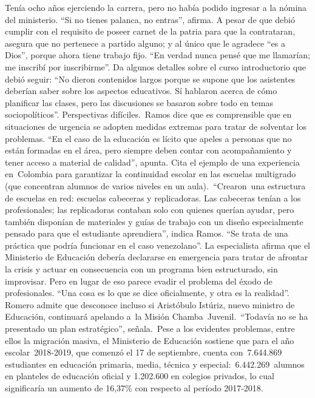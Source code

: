 \documentclass{article}%
\begin{document}
\newline%
%
Tenía ocho años ejerciendo la carrera, pero no había podido ingresar a la nómina del ministerio. “Si no tienes palanca, no entras”, afirma. A pesar de que debió cumplir con el requisito de poseer carnet de la patria para que la contrataran, asegura que no pertenece a partido alguno; y al único que le agradece “es a Dios”, porque ahora tiene trabajo fijo. “En verdad nunca pensé que me llamarían; me inscribí por inscribirme”.%
\newline%
%
Da algunos detalles sobre el curso introductorio que debió seguir: “No dieron contenidos largos porque se supone que los asistentes deberían saber sobre los aspectos educativos. Sí hablaron acerca de cómo planificar las clases, pero las discusiones se basaron sobre todo en temas sociopolíticos”.%
\newline%
%
Perspectivas difíciles.~Ramos dice que es comprensible que en situaciones de urgencia se adopten medidas extremas para tratar de solventar los problemas. “En el caso de la educación es lícito que apeles a personas que no están formadas en el área, pero siempre deben contar con acompañamiento y tener acceso a material de calidad”, apunta.%
\newline%
%
Cita el ejemplo de una experiencia en~Colombia para garantizar la continuidad escolar en las escuelas multigrado (que concentran alumnos de varios niveles en un aula).~“Crearon~una estructura de escuelas en red: escuelas cabeceras y replicadoras. Las cabeceras tenían a los profesionales; las replicadoras contaban solo con quienes querían ayudar, pero también disponían de materiales y guías de trabajo con un diseño especialmente pensado para que el estudiante aprendiera”, indica Ramos. “Se trata de una práctica que podría funcionar en el caso venezolano”.%
\newline%
%
La especialista afirma que el Ministerio de Educación debería declararse en emergencia para tratar de afrontar la crisis y actuar en consecuencia con un programa bien estructurado, sin improvisar. Pero en lugar de eso parece evadir el problema del éxodo de profesionales. “Una cosa es lo que se dice oficialmente, y otra es la realidad”.%
\newline%
%
Romero admite que desconoce incluso si Aristóbulo Istúriz, nuevo ministro de Educación, continuará apelando a~la Misión Chamba~Juvenil.~“Todavía no se ha presentado un plan estratégico”, señala.~Pese a los evidentes problemas, entre ellos la migración masiva, el Ministerio de Educación sostiene que para el año escolar~2018{-}2019, que comenzó el 17 de septiembre, cuenta con~7.644.869 estudiantes en educación primaria, media, técnica y especial:~6.442.269~alumnos en planteles de educación oficial y 1.202.600 en colegios privados, lo cual significaría un aumento de 16,37\% con respecto al período 2017{-}2018.%
\end{document}
